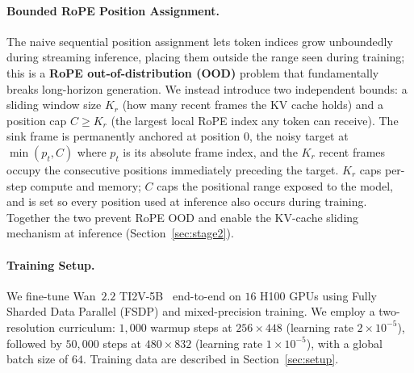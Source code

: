 \paragraph{Bounded RoPE Position Assignment.}
\label{sec:rope_design}
The naive sequential position assignment lets token indices grow
unboundedly during streaming inference, placing them outside the range
seen during training; this is a \textbf{RoPE out-of-distribution (OOD)} problem
that fundamentally breaks long-horizon generation.
We instead introduce two independent bounds: a sliding window size
$K_r$ (how many recent frames the KV cache holds) and a position cap
$C\ge K_r$ (the largest local RoPE index any token can receive).
The sink frame is permanently anchored at position $0$, the noisy
target at $\min(p_t, C)$ where $p_t$ is its absolute frame index, and
the $K_r$ recent frames occupy the consecutive positions immediately
preceding the target.
$K_r$ caps per-step compute and memory; $C$ caps the positional range
exposed to the model, and is set so every position used at inference
also occurs during training. Together the two prevent RoPE OOD and
enable the KV-cache sliding mechanism at inference (Section~\ref{sec:stage2}).

\paragraph{Training Setup. }
We fine-tune Wan~$2.2$ TI2V-5B~\citep{wang2025wan} end-to-end on $16$ H100 GPUs
using Fully Sharded Data Parallel (FSDP) and mixed-precision training.
We employ a two-resolution curriculum: $1{,}000$ warmup steps at $256{\times}448$
(learning rate $2\!\times\!10^{-5}$), followed by $50{,}000$ steps at
$480{\times}832$ (learning rate $1\!\times\!10^{-5}$), with a global batch
size of $64$.
Training data are described in Section~\ref{sec:setup}.


